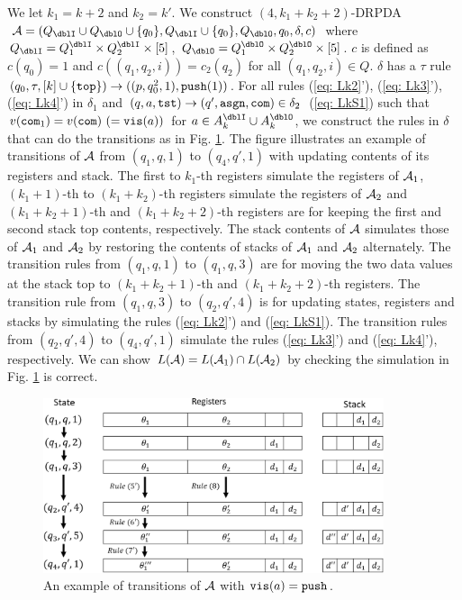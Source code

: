 We let $k_1=k+2$ and $k_2=k'$.
We construct $(4,k_1+k_2+2)$-DRPDA
$\calA=(Q_\dblI\cup Q_\dblO\cup\{q_0\}, Q_\dblI\cup\{q_0\}, Q_\dblO, q_0, \delta, c)$
where $Q_\dblI=Q^\dblI_1\times Q^\dblI_2\times[5]$,
$Q_\dblO=Q^\dblO_1\times Q^\dblO_2\times[5]$.
$c$ is defined as $c(q_0)=1$ and
$c((q_1,q_2,i))=c_2(q_2)$ for all $(q_1,q_2,i)\in Q$.
$\delta$ has a $\tau$ rule $(q_0,\tau,[k]\cup\{\mathtt{top}\})\to((p, q^2_0,1), \mathtt{push}(1))$.
For all rules (\ref{eq: Lk2}'), (\ref{eq: Lk3}'), (\ref{eq: Lk4}') in $\delta_1$ and
$(q, a, \mathtt{tst}) \to (q',\mathtt{asgn}, \mathtt{com})\in\delta_2$ (\ref{eq: LkS1})
such that $v(\mathtt{com}_1)=v(\mathtt{com})\ (=\mathtt{vis}(a))$ for $a\in A^\dblI_{k}\cup A^\dblO_{k}$,
we construct the rules in $\delta$ that
can do the transitions as in Fig. \ref{fig: lem_LkS}.
The figure illustrates an example of transitions of ${\cal A}$
from $(q_1,q,1)$ to $(q_4,q',1)$ with updating
contents of its registers and stack.
The first to $k_1$-th registers simulate
the registers of ${\cal A}_1$,
$(k_1+1)$-th to $(k_1+k_2)$-th registers simulate
the registers of ${\cal A}_2$ and
$(k_1+k_2+1)$-th and $(k_1+k_2+2)$-th registers
are for keeping the first and second stack top contents, respectively.
The stack contents of ${\cal A}$ simulates those of ${\cal A}_1$ and ${\cal A}_2$ by restoring the contents of stacks of ${\cal A}_1$ and ${\cal A}_2$ alternately.
The transition rules from $(q_1,q,1)$ to $(q_1,q,3)$
are for moving the two data values at the stack top
to $(k_1+k_2+1)$-th and $(k_1+k_2+2)$-th registers.
The transition rule from $(q_1,q,3)$ to $(q_2,q',4)$
is for updating states, registers and stacks
by simulating the rules (\ref{eq: Lk2}') and (\ref{eq: LkS1}).
The transition rules from $(q_2,q',4)$ to $(q_4,q',1)$
simulate the rules (\ref{eq: Lk3}') and (\ref{eq: Lk4}'), respectively.
We can show $L({\cal A})=L({\cal A}_1)\cap L({\cal A}_2)$
by checking the simulation in Fig. \ref{fig: lem_LkS}
is correct.

\begin{figure}[t]
  \centering
  \includegraphics[width=10cm]{lem_LkS.png}
  \caption{An example of transitions of ${\cal A}$ with $\mathtt{vis}(a)=\mathtt{push}$.}
  \label{fig: lem_LkS}
\end{figure}

